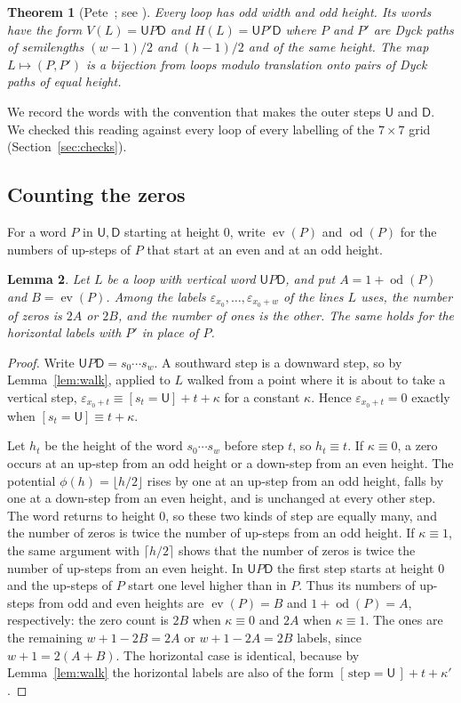 \documentclass[11pt]{amsart}
\newtheorem{theorem}{Theorem}[section]
\newtheorem{lemma}[theorem]{Lemma}
\theoremstyle{definition}
\theoremstyle{remark}
\newcommand{\ev}{\operatorname{ev}}
\newcommand{\od}{\operatorname{od}}
\newcommand{\U}{\mathsf{U}}
\newcommand{\D}{\mathsf{D}}
\begin{document}
\begin{theorem}[Pete~{\cite{Pet08}}; see {\cite[Theorem~3.1]{DK24}}]\label{thm:pete}
Every loop has odd width and odd height. Its words have the form $V(L)=\U P\D$ and $H(L)=\U P'\D$ where
$P$ and $P'$ are Dyck paths of semilengths $(w-1)/2$ and $(h-1)/2$ and of the same height. The map
$L\mapsto(P,P')$ is a bijection from loops modulo translation onto pairs of Dyck paths of equal height.
\end{theorem}

We record the words with the convention that makes the outer steps $\U$ and $\D$. We checked this
reading against every loop of every labelling of the $7\times7$ grid (Section~\ref{sec:checks}).

\subsection{Counting the zeros}
For a word $P$ in $\U,\D$ starting at height $0$, write $\ev(P)$ and $\od(P)$ for the numbers of
up-steps of $P$ that start at an even and at an odd height.

\begin{lemma}\label{lem:zeros}
Let $L$ be a loop with vertical word $\U P\D$, and put $A=1+\od(P)$ and $B=\ev(P)$. Among the labels
$\varepsilon_{x_0},\dots,\varepsilon_{x_0+w}$ of the lines $L$ uses, the number of zeros is $2A$ or
$2B$, and the number of ones is the other. The same holds for the horizontal labels with $P'$ in place
of $P$.
\end{lemma}

\begin{proof}
Write $\U P\D=s_0\cdots s_w$. A southward step is a downward step, so by Lemma~\ref{lem:walk}, applied
to $L$ walked from a point where it is about to take a vertical step,
$\varepsilon_{x_0+t}\equiv[s_t=\U]+t+\kappa$ for a constant $\kappa$. Hence $\varepsilon_{x_0+t}=0$
exactly when $[s_t=\U]\equiv t+\kappa$.

Let $h_t$ be the height of the word $s_0\cdots s_w$ before step $t$, so $h_t\equiv t$. If $\kappa\equiv
0$, a zero occurs at an up-step from an odd height or a down-step from an even height. The potential
$\phi(h)=\lfloor h/2\rfloor$ rises by one at an up-step from an odd height, falls by one at a down-step
from an even height, and is unchanged at every other step. The word returns to height $0$, so these two
kinds of step are equally many, and the number of zeros is twice the number of up-steps from an odd
height. If $\kappa\equiv1$, the same argument with $\lceil h/2\rceil$ shows that the number of zeros is
twice the number of up-steps from an even height. In $\U P\D$ the first step starts at height $0$ and
the up-steps of $P$ start one level higher than in $P$. Thus its numbers of up-steps from odd and even
heights are $\ev(P)=B$ and $1+\od(P)=A$, respectively: the zero count is $2B$ when $\kappa\equiv0$
and $2A$ when $\kappa\equiv1$. The ones are the remaining $w+1-2B=2A$ or $w+1-2A=2B$ labels,
since $w+1=2(A+B)$. The
horizontal case is identical, because by Lemma~\ref{lem:walk} the horizontal labels are also of the
form $[\,\text{step}=\U\,]+t+\kappa'$.
\end{proof}
\end{document}
